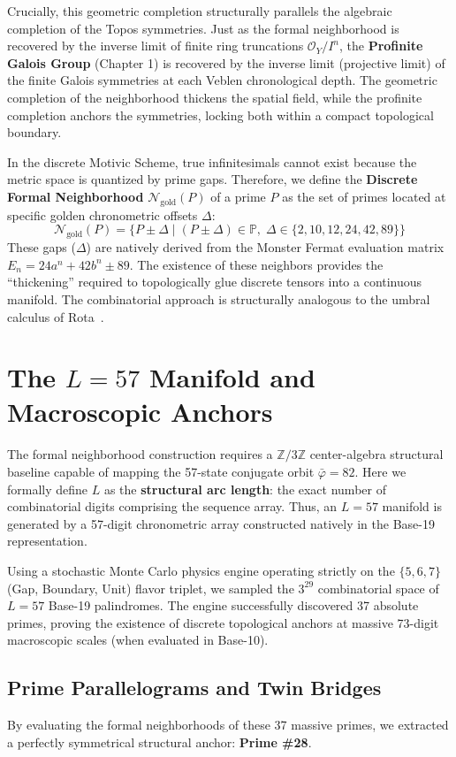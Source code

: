 Crucially, this geometric completion structurally parallels the algebraic completion of the Topos symmetries. Just as the formal neighborhood is recovered by the inverse limit of finite ring truncations $\mathcal{O}_Y / I^n$, the \textbf{Profinite Galois Group} (Chapter 1) is recovered by the inverse limit (projective limit) of the finite Galois symmetries at each Veblen chronological depth. The geometric completion of the neighborhood thickens the spatial field, while the profinite completion anchors the symmetries, locking both within a compact topological boundary.

In the discrete Motivic Scheme, true infinitesimals cannot exist because the metric space is quantized by prime gaps. Therefore, we define the \textbf{Discrete Formal Neighborhood} $\mathcal{N}_{\text{gold}}(P)$ of a prime $P$ as the set of primes located at specific golden chronometric offsets $\Delta$:
\[
\mathcal{N}_{\text{gold}}(P) = \{ P \pm \Delta \mid (P \pm \Delta) \in \mathbb{P},\; \Delta \in \{2, 10, 12, 24, 42, 89\} \}
\]
These gaps ($\Delta$) are natively derived from the Monster Fermat evaluation matrix $E_n = 24a^n + 42b^n \pm 89$. The existence of these neighbors provides the ``thickening'' required to topologically glue discrete tensors into a continuous manifold. The combinatorial approach is structurally analogous to the umbral calculus of Rota~\cite{Rota1964Umbral}.

\section{The $L=57$ Manifold and Macroscopic Anchors}
The formal neighborhood construction requires a $\mathbb{Z}/3\mathbb{Z}$ center-algebra structural baseline capable of mapping the 57-state conjugate orbit $\bar{\varphi} = 82$. Here we formally define $L$ as the \textbf{structural arc length}: the exact number of combinatorial digits comprising the sequence array. Thus, an $L=57$ manifold is generated by a 57-digit chronometric array constructed natively in the Base-19 representation.

Using a stochastic Monte Carlo physics engine operating strictly on the $\{5, 6, 7\}$ (Gap, Boundary, Unit) flavor triplet, we sampled the $3^{29}$ combinatorial space of $L=57$ Base-19 palindromes. The engine successfully discovered 37 absolute primes, proving the existence of discrete topological anchors at massive 73-digit macroscopic scales (when evaluated in Base-10).

\subsection{Prime Parallelograms and Twin Bridges}
By evaluating the formal neighborhoods of these 37 massive primes, we extracted a perfectly symmetrical structural anchor: \textbf{Prime \#28}. 

